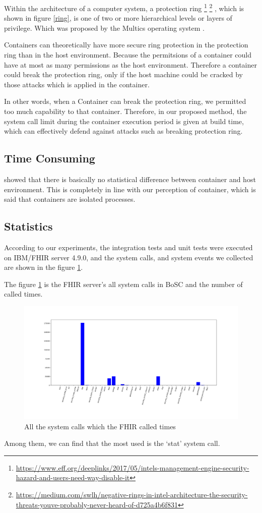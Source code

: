 Within the architecture of a computer system, a protection ring
\footnote{\url{https://www.eff.org/deeplinks/2017/05/intels-management-engine-security-hazard-and-users-need-way-disable-it}}
\footnote{\url{https://medium.com/swlh/negative-rings-in-intel-architecture-the-security-threats-youve-probably-never-heard-of-d725a4b6f831}}
, which is shown in figure \ref{ring}, is one of two or more
hierarchical levels or layers of privilege. Which was proposed by the Multics 
operating system \cite{6234805}.

Containers can theoretically have more secure ring protection in the
protection ring than in the host environment. Because the permitsions
of a container could have at most as many permissions as the host environment.
Therefore a container could break the protection ring, only if the host
machine could be cracked by those attacks which is applied in the container.

In other words, when a Container can break the protection ring, we permitted
too much capability to that container. Therefore, in our proposed method, the
system call limit during the container execution period is given at build time,
which can effectively defend against attacks such as breaking protection ring.

\subsection{Time Consuming}
\textcite{KOZHIRBAYEV2017175} showed that there is basically no
statistical difference between container and host environment.
This is completely in line with our perception of container, 
which is said that containers are isolated processes.

\subsection{Statistics}
According to our experiments, the integration tests and unit
tests were executed on IBM/FHIR server 4.9.0, and the system calls,
and system events we collected are shown in the figure \ref{hist}.

The figure \ref{hist} is the FHIR server's all system calls in
BoSC\cite{1495942} and the number of called times.
\begin{figure}
    \centering
    \includegraphics[width=\textwidth]{src/hist.png}
    \caption{All the system calls which the FHIR called times}
    \label{hist}
\end{figure}
Among them, we can find that the most used is the `stat' system call.


